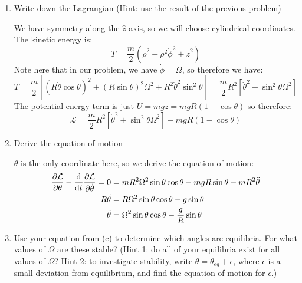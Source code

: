\documentclass[10pt]{article}
\begin{document}
    \begin{enumerate}[label=(\alph*)]
        \item Write down the Lagrangian (Hint: use the result of the previous problem)
        
        \begin{solution}
            We have symmetry along the $\hat z$ axis, so we will choose cylindrical coordinates. The kinetic energy is: 
            \[ T = \frac{m}{2}(\dot \rho^2 + \rho^2 \dot \phi^2 + \dot z^2)\]
            Note here that in our problem, we have $\dot \phi = \Omega$, so therefore we have:
            \[ T = \frac{m}{2}\left[(R\dot \theta \cos \theta)^2 + (R \sin \theta)^2 \Omega^2 + R^2 \dot \theta^2 \sin^2\theta\right] = \frac{m}{2} R^2\left[ \dot \theta^2 + \sin^2 \theta \Omega^2\right]\]
            The potential energy term is just $U = mgz = mgR(1-\cos \theta)$ so therefore: 
            \[ \mathcal L = \frac{m}{2} R^2\left[ \dot \theta^2 + \sin^2 \theta \Omega^2\right] - mgR(1 - \cos \theta)\]
        \end{solution}
        \item Derive the equation of motion
        
        \begin{solution}
            $\theta$ is the only coordinate here, so we derive the equation of motion:
            \begin{align*}
                \pdv{\mathcal L}{\theta} - \dv{t}\pdv{\mathcal L}{\dot \theta} = 0 &= mR^2 \Omega^2 \sin \theta \cos \theta - mgR\sin \theta - mR^2 \ddot \theta\\
                R\ddot \theta &= R\Omega^2 \sin \theta \cos \theta - g\sin \theta\\
                \ddot \theta &= \Omega^2 \sin \theta \cos \theta - \frac{g}{R} \sin \theta
            \end{align*}
        \end{solution}
        \item Use your equation from (c) to determine which angles are equilibria. For what values of $\Omega$ are these stable? (Hint 1: do all of your equilibria exist for all values of $\Omega$? Hint 2: to investigate stability, write $\theta = \theta_{eq} + \epsilon$, where $\epsilon$ is a small deviation from equilibrium, and find the equation of motion for $\epsilon$.)
        

\end{enumerate}
\end{document}
